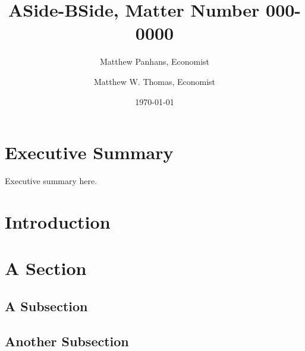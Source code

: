 \documentclass[12pt]{bememo}
\title{ASide-BSide, Matter Number 000-0000}
\author{Matthew Panhans, Economist \and Matthew W. Thomas, Economist}
\date{\today}
\begin{document}
\maketitle

\section*{Executive Summary}\label{sec:exec}

Executive summary here.

\section{Introduction}

\econ[2-3]

\section{A Section}

\econ[4]

\subsection{A Subsection}

\econ[5-7]

\subsection{Another Subsection}

\econ[8-10]
\end{document}
